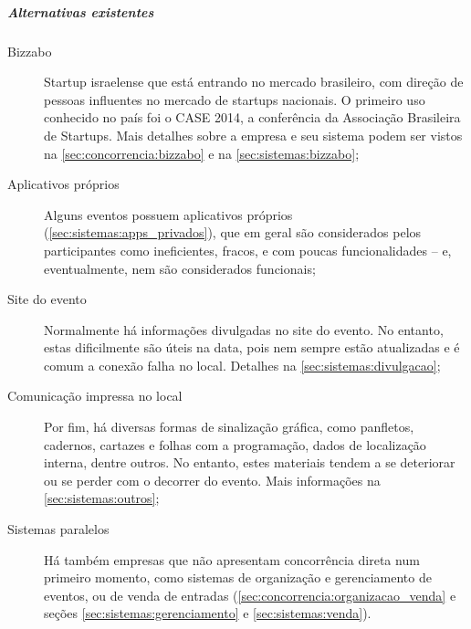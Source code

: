 \documentclass[12pt,a4paper,twoside,hyphens,english,brazil]{abntex2}
\newcommand{\hip}{{\color{BlueViolet}\framebox[1.1\width]{HIP}}}
\newcommand{\conf}{{\color{OliveGreen}\framebox[1.1\width]{CNF}}}
\begin{document}
\subparagraph*{Alternativas existentes}
\begin{description}
\item[\conf{} Bizzabo] Startup israelense que está entrando no mercado brasileiro, com direção de pessoas influentes no mercado de startups nacionais. O primeiro uso conhecido no país foi o CASE 2014, a conferência da Associação Brasileira de Startups. Mais detalhes sobre a empresa e seu sistema podem ser vistos na \autoref{sec:concorrencia:bizzabo} e na \autoref{sec:sistemas:bizzabo};

\item[\hip{} Aplicativos próprios] Alguns eventos possuem aplicativos próprios (\autoref{sec:sistemas:apps_privados}), que em geral são considerados pelos participantes como ineficientes, fracos, e com poucas funcionalidades -- e, eventualmente, nem são considerados funcionais;

\item[\hip{} Site do evento] Normalmente há informações divulgadas no site do evento. No entanto, estas dificilmente são úteis na data, pois nem sempre estão atualizadas e é comum a conexão falha no local. Detalhes na \autoref{sec:sistemas:divulgacao};

\item[\hip{} Comunicação impressa no local] Por fim, há diversas formas de sinalização gráfica, como panfletos, cadernos, cartazes e folhas com a programação, dados de localização interna, dentre outros. No entanto, estes materiais tendem a se deteriorar ou se perder com o decorrer do evento. Mais informações na \autoref{sec:sistemas:outros};

\item[\hip{} Sistemas paralelos] Há também empresas que não apresentam concorrência direta num primeiro momento, como sistemas de organização e gerenciamento de eventos, ou de venda de entradas (\autoref{sec:concorrencia:organizacao_venda} e seções \ref{sec:sistemas:gerenciamento} e \ref{sec:sistemas:venda}).
\end{description}
\end{document}
